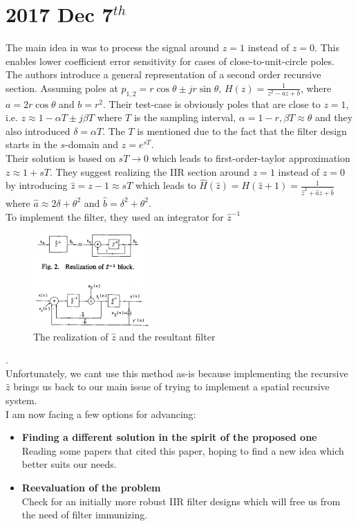 \documentclass[12pt]{article}
\begin{document}
\section{2017 Dec 7$^{th}$}
The main idea in \cite{Agarwal1975NewNoise} was to process the signal around $ z=1 $ instead of $ z=0 $. This enables lower coefficient error sensitivity for cases of close-to-unit-circle poles. The authors introduce a general representation of a second order recursive section. Assuming poles at $ p_{1,2} = r\cos{\theta} \pm jr\sin{\theta} $, $ H(z) = \frac{1}{z^{2}-az+b} $, where $ a = 2r\cos{\theta} $ and $ b = r^{2} $. Their test-case is obviously poles that are close to $ z=1 $, i.e. $ z \approx 1-\alpha T \pm j\beta T $ where $ T $ is the sampling interval, $ \alpha = 1-r, \beta T \approx \theta $ and they also introduced $ \delta = \alpha T $. The $ T $ is mentioned due to the fact that the filter design starts in the $ s $-domain and $ z=e^{sT} $.
\\
Their solution is based on $ sT \rightarrow 0 $ which leads to first-order-taylor approximation $ z \approx 1+sT $. They suggest realizing the IIR section around $ z=1 $ instead of $ z=0 $ by introducing $ \hat{z} = z-1 \approx sT $ which leads to $ \hat{H}\left(\hat{z}\right) = H\left( \hat{z}+1 \right) = \frac{1}{\hat{z}^{2}+\hat{a}z+\hat{b}} $ where $ \hat{a} \approx 2\delta+\theta^{2} $ and $ \hat{b} = \delta^2 + \theta^2 $. 
\\
To implement the filter, they used an integrator for $ \hat{z}^{-1} $
\begin{figure}[!h]
\begin{center}
\includegraphics[width=0.4\textwidth]{Media/zHatRealization.PNG}
\caption{The realization of $ \hat{z} $ and the resultant filter}
\label{fig:zhatRealization}
\end{center}
\end{figure}.
\\
Unfortunately, we cant use this method as-is because implementing the recursive $ \hat{z} $ brings us back to our main issue of trying to implement a spatial recursive system.
\\
I am now facing a few options for advancing:
\begin{itemize}
\item{
\textbf{Finding a different solution in the spirit of the proposed one}
\\
Reading some papers that cited this paper, hoping to find a new idea which better suits our needs.
}
\item{
\textbf{Reevaluation of the problem}
\\
Check for an initially more robust IIR filter designs which will free us from the need of filter immunizing.
}
\end{itemize}
\end{document}
